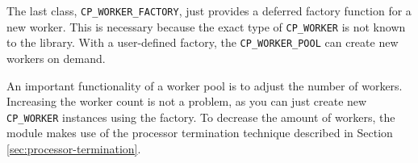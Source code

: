 \documentclass[a4paper,10pt]{article}
\begin{document}
The last class, \lstinline!CP_WORKER_FACTORY!, just provides a deferred factory function for a new worker.
This is necessary because the exact type of \lstinline!CP_WORKER! is not known to the library.
With a user-defined factory, the \lstinline!CP_WORKER_POOL! can create new workers on demand.





An important functionality of a worker pool is to adjust the number of workers.
Increasing the worker count is not a problem, as you can just create new \lstinline!CP_WORKER! instances using the factory.
To decrease the amount of workers, the module makes use of the processor termination technique described in Section \ref{sec:processor-termination}.


% 
% 
% 
% 
%   
%   
% 
% 
% 
\end{document}
